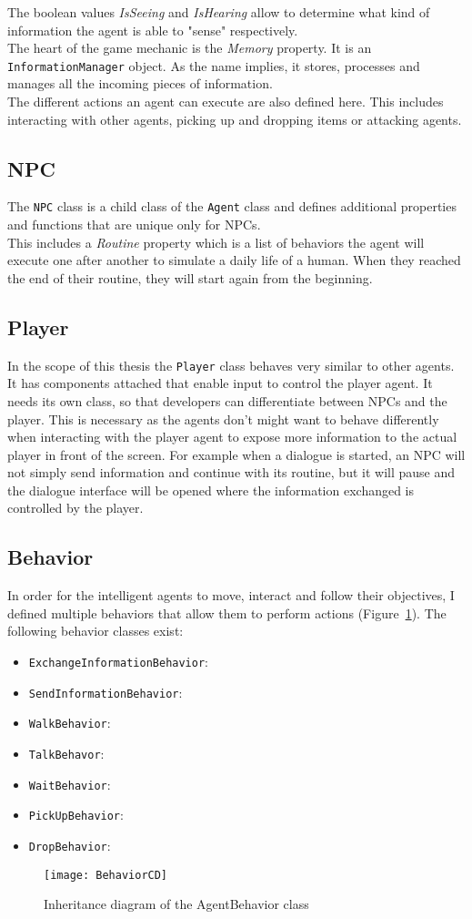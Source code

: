 The boolean values \textit{IsSeeing} and \textit{IsHearing} allow to determine what kind of information the agent is able to "sense" respectively.\\
The heart of the game mechanic is the \textit{Memory} property. It is an \verb|InformationManager| object. As the name implies, it stores, processes and manages all the incoming pieces of information.\\
The different actions an agent can execute are also defined here. This includes interacting with other agents, picking up and dropping items or attacking agents.
\subsection{NPC}
The \verb|NPC| class is a child class of the \verb|Agent| class and defines additional properties and functions that are unique only for NPCs.\\
This includes a \textit{Routine} property which is a list of behaviors the agent will execute one after another to simulate a daily life of a human. When they reached the end of their routine, they will start again from the beginning.
\subsection{Player}
In the scope of this thesis the \verb|Player| class behaves very similar to other agents. It has components attached that enable input to control the player agent. It needs its own class, so that developers can differentiate between NPCs and the player. This is necessary as the agents don't might want to behave differently when interacting with the player agent to expose more information to the actual player in front of the screen. For example when a dialogue is started, an NPC will not simply send information and continue with its routine, but it will pause and the dialogue interface will be opened where the information exchanged is controlled by the player.
\subsection{Behavior}
In order for the intelligent agents to move, interact and follow their objectives, I defined multiple behaviors that allow them to perform actions (Figure~\ref{fig:behaviorCD}). The following behavior classes exist:
\begin{itemize}
	\item \verb|ExchangeInformationBehavior|:
	\item \verb|SendInformationBehavior|:
	\item \verb|WalkBehavior|:
	\item \verb|TalkBehavor|:
	\item \verb|WaitBehavior|:
	\item \verb|PickUpBehavior|:
	\item \verb|DropBehavior|:
\end{itemize}
\begin{figure}
	\centering
	\texttt{[image: BehaviorCD]}
	\caption{Inheritance diagram of the AgentBehavior class}
	\label{fig:behaviorCD}
\end{figure}
